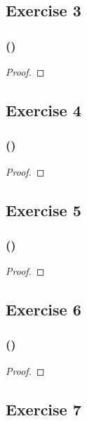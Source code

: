 \documentclass[14pt]{extarticle}
\begin{document}
\subsection{Exercise 3}

\subsubsection{()}

\begin{proof}

\end{proof}

\subsection{Exercise 4}

\subsubsection{()}

\begin{proof}

\end{proof}

\subsection{Exercise 5}

\subsubsection{()}

\begin{proof}

\end{proof}

\subsection{Exercise 6}

\subsubsection{()}

\begin{proof}

\end{proof}

\subsection{Exercise 7}
\end{document}
